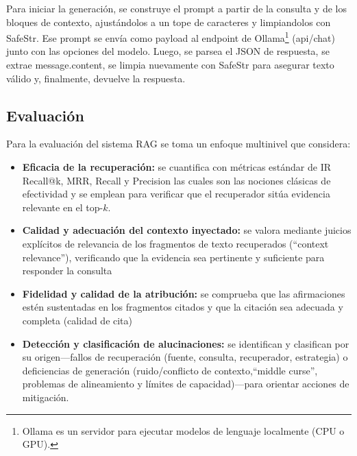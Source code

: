 Para iniciar la generación, se construye el prompt a partir de la consulta y de los bloques de contexto, ajustándolos a un tope de caracteres y limpiandolos con SafeStr. 
Ese prompt se envía como payload al endpoint de Ollama\footnote{Ollama es un servidor para ejecutar modelos de lenguaje localmente (CPU o GPU).} 
(api/chat) junto con las opciones del modelo. Luego, se parsea el JSON de respuesta, se extrae message.content, se limpia nuevamente con SafeStr para asegurar texto válido 
y, finalmente, devuelve la respuesta.


\subsection{Evaluación}
Para la evaluación del sistema RAG se toma un enfoque multinivel que  considera:
\begin{itemize}
    \item \textbf{Eficacia de la recuperación:} se cuantifica con métricas estándar de IR Recall@k,
    MRR, Recall y Precision las cuales son las nociones clásicas de efectividad y se emplean para
    verificar que el recuperador sitúa evidencia relevante en el top-$k$.

    \item \textbf{Calidad y adecuación del contexto inyectado:} se valora mediante juicios explícitos de relevancia
    de los fragmentos de texto recuperados (“context relevance”), verificando que la evidencia sea pertinente y suficiente
    para responder la consulta

    \item \textbf{Fidelidad y calidad de la atribución:} se comprueba que las afirmaciones estén sustentadas en los
    fragmentos citados y que la citación sea adecuada y completa (calidad de cita)

    \item \textbf{Detección y clasificación de alucinaciones:} se identifican y clasifican por su origen—fallos de
    recuperación (fuente, consulta, recuperador, estrategia) o deficiencias de generación (ruido/conflicto de
    contexto,“middle curse”, problemas de alineamiento y límites de capacidad)—para orientar acciones de mitigación.
\end{itemize}


